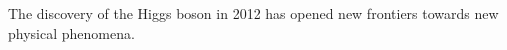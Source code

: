 \label{sec:introduction}

The discovery of the Higgs boson in 2012 has opened new frontiers towards new physical phenomena. 
